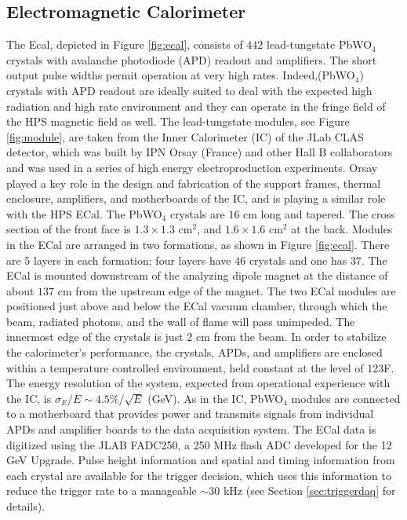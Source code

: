 \subsection{Electromagnetic Calorimeter} 
\label{sec:ecal}

The Ecal, depicted in Figure \ref{fig:ecal}, consists of $442$ lead-tungstate PbWO$_4$ crystals with avalanche photodiode (APD) 
readout and amplifiers. The short output pulse widths permit operation at very high rates. Indeed,(PbWO$_4$) crystals with APD readout 
are ideally suited to deal with the expected high radiation and high rate environment and they can operate in the fringe field of the HPS
magnetic field as well. The lead-tungstate modules, see Figure \ref{fig:module}, are taken from the Inner 
Calorimeter (IC) of the JLab CLAS detector, which was built by IPN Orsay (France) and other Hall B collaborators and was used
in a series of high energy electroproduction experiments. 
Orsay played a key role in the design and fabrication of the support frames, thermal enclosure, amplifiers,  
and motherboards of the IC, and is playing a similar role with the HPS ECal.  
The PbWO$_4$ crystals are $16$ cm long and tapered. The cross section of the front face is $1.3\times 1.3$ cm$^2$, 
and  $1.6\times 1.6$ cm$^2$ at the back. Modules in the ECal are arranged in two formations, as shown in Figure \ref{fig:ecal}. 
There are 5 layers in each formation; four layers have $46$ crystals and one has $37$. The ECal is mounted downstream of the 
analyzing dipole magnet at the distance of about $137$ cm from the upstream edge of the magnet. The two ECal modules are 
positioned just above and below the ECal vacuum chamber, through which the beam, radiated photons, and the wall of flame will pass
unimpeded. The innermost edge of the crystals is just $2$ cm from the beam. In order to stabilize the calorimeter's performance, 
the crystals, APDs, and amplifiers are enclosed within a temperature controlled environment, held constant at 
the level of 1\!\char23F. The energy resolution of the system, expected from operational experience with the IC, 
is $\sigma_E/E \sim 4.5\%/\sqrt{E}$ (GeV). As in the IC, PbWO$_4$ modules are connected to a motherboard that provides
power and transmits signals from individual APDs and amplifier boards to the data acquisition system. The ECal data is 
digitized using the JLAB FADC250, a 250 MHz flash ADC developed for the 12 GeV Upgrade. Pulse height information and spatial 
and timing information from each crystal are available for the trigger decision, which uses this information to reduce the trigger rate to a manageable $\sim 30$ kHz (see Section \ref{sec:triggerdaq} 
for details).

